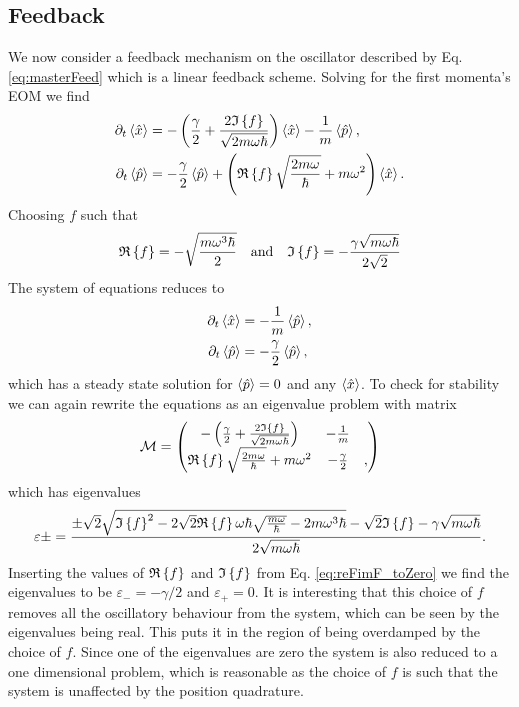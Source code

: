 \subsection{Feedback}
We now consider a feedback mechanism on the oscillator described by Eq. \eqref{eq:masterFeed} which is a linear feedback scheme. Solving for the first momenta's EOM we find 
\begin{align}
    \partial_t\expval{\hat{x}} &= - \left(\frac{\gamma}{2} + \frac{2 \mathfrak{I}\left\{f\right\}}{\sqrt{2 m \omega \hbar}} \right)\expval{\hat{x}} - \frac{1}{m} \expval{\hat{p}},\\
    \partial_t\expval{\hat{p}} &= -\frac{\gamma}{2}\expval{\hat{p}} + \left(\mathfrak{R}\left\{f\right\} \sqrt{\frac{2 m \omega}{\hbar}} + m \omega^2 \right) \expval{\hat{x}}.
\end{align}
Choosing $f$ such that
\begin{equation}
    \mathfrak{R}\left\{f\right\} = - \sqrt{\frac{m \omega^3 \hbar}{2}} \quad \text{and} \quad \mathfrak{I}\left\{f\right\} = -\frac{\gamma\sqrt{m\omega\hbar}}{2\sqrt{2}} \label{eq:reFimF_toZero}
\end{equation}
The system of equations reduces to
\begin{align}
    \partial_t\expval{\hat{x}} &= - \frac{1}{m} \expval{\hat{p}},\\
    \partial_t\expval{\hat{p}} &= -\frac{\gamma}{2} \expval{\hat{p}},
\end{align}
which has a steady state solution for $\expval{\hat{p}} = 0$ and any $\expval{\hat{x}}$. To check for stability we can again rewrite the equations as an eigenvalue problem with matrix
\begin{equation}
    \mathcal{M} = 
    \begin{pmatrix}
        - \left(\frac{\gamma}{2} + \frac{2 \mathfrak{I}\left\{f\right\}}{\sqrt{2 m \omega \hbar}} \right) & - \frac{1}{m} \\
         \mathfrak{R}\left\{f\right\} \sqrt{\frac{2 m \omega}{\hbar}} + m \omega^2 & -\frac{\gamma}{2} &,  
    \end{pmatrix} \label{eq:matrixM}
\end{equation}
which has eigenvalues
\begin{equation}
    \varepsilon\pm = \frac{\pm \sqrt{2} \sqrt{ \mathfrak{I}\left\{f\right\}^2 - 2 \sqrt{2} \mathfrak{R}\left\{f\right\} \omega \hbar \sqrt{\frac{m\omega}{\hbar}} - 2 m \omega^3 \hbar } -\sqrt{2}  \mathfrak{I}\left\{f\right\} - \gamma  \sqrt{m \omega \hbar} }{ 2  \sqrt{ m \omega \hbar}}. \label{eq:eigenvalueFirstMomenta}
\end{equation}
Inserting the values of $\mathfrak{R}\left\{f\right\}$ and $\mathfrak{I}\left\{f\right\}$ from Eq. \eqref{eq:reFimF_toZero} we find the eigenvalues to be $\varepsilon_- = -\gamma /2$ and $\varepsilon_+ = 0$. It is interesting that this choice of $f$ removes all the oscillatory behaviour from the system, which can be seen by the eigenvalues being real. This puts it in the region of being overdamped by the choice of $f$. Since one of the eigenvalues are zero the system is also reduced to a one dimensional problem, which is reasonable as the choice of $f$ is such that the system is unaffected by the position quadrature.

